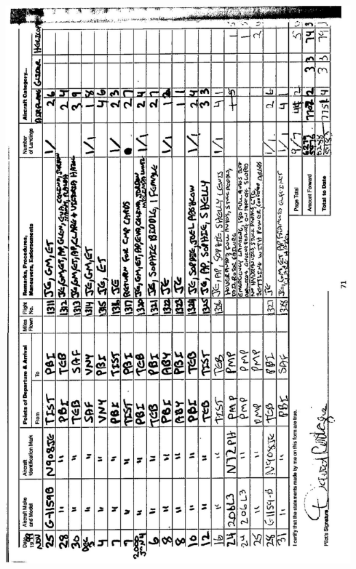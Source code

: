 \documentclass[10pt]{article}
\begin{document}
\includegraphics[max width=\textwidth, center]{2025_02_27_dd68c3d38de88f0516d9g-075}\\
\end{document}
